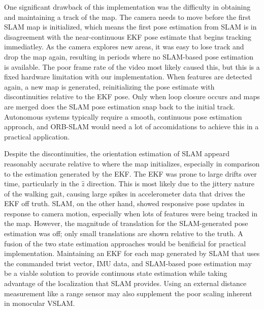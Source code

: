 \documentclass[twocolumn]{article}
\begin{document}
One significant drawback of this implementation was the difficulty in obtaining and maintaining a track of the map. The camera needs to move before the first SLAM map is initialized, which means the first pose estimation from SLAM is in disagreement with the near-continuous EKF pose estimate that begins tracking immediatley. As the camera explores new areas, it was easy to lose track and drop the map again, resulting in periods where no SLAM-based pose estimation is available. The poor frame rate of the video most likely caused this, but this is a fixed hardware limitation with our implementation. When features are detected again, a new map is generated, reinitializing the pose estimate with discontinuities relative to the EKF pose. Only when loop closure occurs and maps are merged does the SLAM pose estimation snap back to the initial track. Autonomous systems typically require a smooth, continuous pose estimation approach, and ORB-SLAM would need a lot of accomidations to achieve this in a practical application.

Despite the discontinuities, the orientation estimation of SLAM appeard reasonably accurate relative to where the map initializes, especially in comparison to the estimation generated by the EKF. The EKF was prone to large drifts over time, particularly in the $\hat{z}$ direction. This is most likely due to the jittery nature of the walking gait, causing large spikes in accelerometer data that drives the EKF off truth. SLAM, on the other hand, showed responsive pose updates in response to camera motion, especially when lots of features were being tracked in the map. However, the magnitude of translation for the SLAM-generated pose estimation was off; only small translations are shown relative to the truth. A fusion of the two state estimation approaches would be benificial for practical implementation. Maintaining an EKF for each map generated by SLAM that uses the commanded twist vector, IMU data, and SLAM-based pose estimation may be a viable solution to provide continuous state estimation while taking advantage of the localization that SLAM provides. Using an external distance measurement like a range sensor may also supplement the poor scaling inherent in monocular VSLAM. 

\printbibliography
\end{document}
